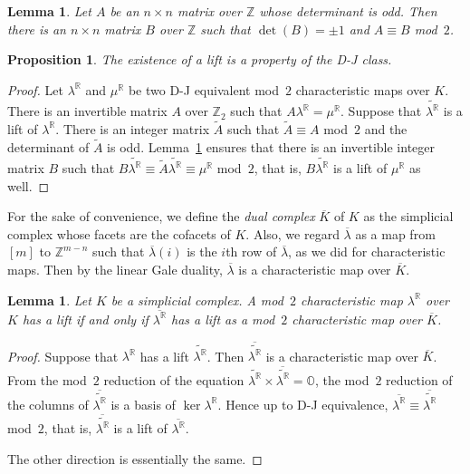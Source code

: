 \documentclass[11pt]{amsart}
\theoremstyle{plain}
\newtheorem{proposition}[theorem]{Proposition}
\newtheorem{lemma}[theorem]{Lemma}
\numberwithin{equation}{section}
\theoremstyle{definition}
\newcommand{\R}{\mathbb{R}}
\newcommand{\Z}{\mathbb{Z}}
\begin{document}
\begin{lemma} \label{lemma:Choi-Park2016}\cite{Choi-Park2016}
    Let $A$ be an $n \times n$ matrix over $\Z$ whose determinant is odd.
    Then there is an $n \times n$ matrix $B$ over $\Z$ such that $\det(B)=\pm 1$ and $A \equiv B$ mod~$2$.
\end{lemma}

\begin{proposition} \label{proposition:lifting_is_D-J_class_property}
   The existence of a lift is a property of the D-J class.
\end{proposition}

\begin{proof}
Let $\lambda^\R$ and $\mu^\R$ be two D-J equivalent mod~$2$ characteristic maps over $K$.
There is an invertible matrix $A$ over $\Z_2$ such that $A \lambda^\R = \mu^\R$.
Suppose that $\widetilde{\lambda^\R}$ is a lift of $\lambda^\R$.
There is an integer matrix $\widetilde{A}$ such that $\widetilde{A} \equiv A$ mod~$2$ and the determinant of $\widetilde{A}$ is odd.
Lemma~\ref{lemma:Choi-Park2016} ensures that there is an invertible integer matrix $B$ such that
$B \widetilde{\lambda^\R} \equiv \widetilde{A} \widetilde{\lambda^\R} \equiv \mu^\R$ mod~$2$, that is, $B \widetilde{\lambda^\R}$ is a lift of $\mu^\R$ as well.
\end{proof}

For the sake of convenience, we define the \emph{dual complex} $\overline{K}$ of $K$ as the simplicial complex whose facets are the cofacets of $K$.
Also, we regard $\overline{\lambda}$ as a map from $[m]$ to $\Z^{m-n}$ such that $\overline{\lambda}(i)$ is the $i$th row of $\overline{\lambda}$, as we did for characteristic maps.
Then by the linear Gale duality, $\overline{\lambda}$ is a characteristic map over $\overline{K}$.

\begin{lemma} \label{lemma: dual lifting}
    Let $K$ be a simplicial complex.
    A mod~$2$ characteristic map $\lambda^\R$ over $K$ has a lift if and only if $\overline{\lambda^\R}$ has a lift as a mod~$2$ characteristic map over $\overline{K}$.
\end{lemma}

\begin{proof}
    Suppose that $\lambda^\R$ has a lift $\widetilde{\lambda^\R}$.
    Then $\overline{\widetilde{\lambda^\R}}$ is a characteristic map over $\overline{K}$.
    From the mod~$2$ reduction of the equation $\widetilde{\lambda^\R} \times \overline{\widetilde{\lambda^\R}} = \mathds{O}$, the mod~$2$ reduction of the columns of $\overline{\widetilde{\lambda^\R}}$ is a basis of $\ker \lambda^\R$.
    Hence up to D-J equivalence, $\overline{\lambda^\R} \equiv \overline{\widetilde{\lambda^\R}}$ mod~$2$, that is, $\overline{\widetilde{\lambda^\R}}$ is a lift of $\overline{\lambda^\R}$.

    The other direction is essentially the same.
\end{proof}
\end{document}
